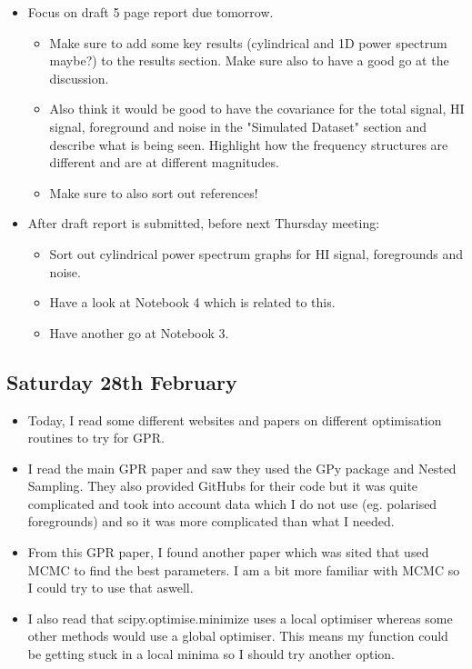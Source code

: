 \begin{itemize}
    \item Focus on draft 5 page report due tomorrow. 
    \begin{itemize}
        \item Make sure to add some key results (cylindrical and 1D power spectrum maybe?) to the results section. Make sure also to have a good go at the discussion. 
        \item Also think it would be good to have the covariance for the total signal, HI signal, foreground and noise in the "Simulated Dataset" section and describe what is being seen. Highlight how the frequency structures are different and are at different magnitudes.
        \item Make sure to also sort out references!
    \end{itemize}
\item After draft report is submitted, before next Thursday meeting:
\begin{itemize}
    \item Sort out cylindrical power spectrum graphs for HI signal, foregrounds and noise.
\end{itemize}
\begin{itemize}
    \begin{itemize}
        \item Have a look at Notebook 4 which is related to this.
    \end{itemize}
\end{itemize}
\begin{itemize}
    \item Have another go at Notebook 3.
\end{itemize}
\end{itemize}

\subsection{Saturday 28th February}

\begin{itemize}
    \item Today, I read some different websites and papers on different optimisation routines to try for GPR.
    \item I read the main GPR paper and saw they used the GPy package and Nested Sampling. They also provided GitHubs for their code but it was quite complicated and took into account data which I do not use (eg. polarised foregrounds) and so it was more complicated than what I needed.
    \item From this GPR paper, I found another paper which was sited that used MCMC to find the best parameters. I am a bit more familiar with MCMC so I could try to use that aswell.
    \item I also read that scipy.optimise.minimize uses a local optimiser whereas some other methods would use a global optimiser. This means my function could be getting stuck in a local minima so I should try another option.
\end{itemize}